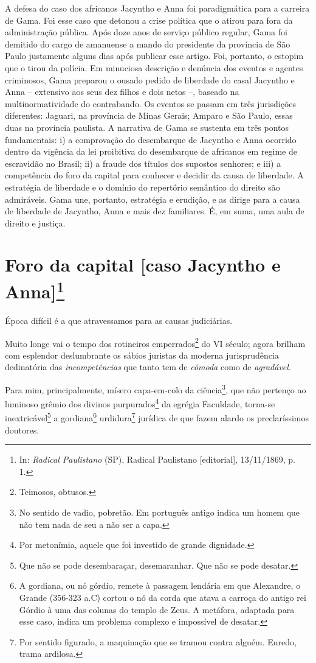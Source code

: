 {\small\noindent
A defesa do caso dos africanos Jacyntho e Anna foi paradigmática
para a carreira de Gama. Foi esse caso que detonou a crise política que
o atirou para fora da administração pública. Após doze anos de serviço
público regular, Gama foi demitido do cargo de amanuense a mando do
presidente da província de São Paulo justamente alguns dias após
publicar esse artigo. Foi, portanto, o estopim que o tirou da polícia.
Em minuciosa descrição e denúncia dos eventos e agentes criminosos, Gama
preparou o ousado pedido de liberdade do casal Jacyntho e Anna --
extensivo aos seus dez filhos e dois netos --, baseado na
multinormatividade do contrabando. Os eventos se passam em três
jurisdições diferentes: Jaguari, na província de Minas Gerais; Amparo e
São Paulo, essas duas na província paulista. A narrativa de Gama se
sustenta em três pontos fundamentais: i) a comprovação do desembarque de
Jacyntho e Anna ocorrido dentro da vigência da lei proibitiva do
desembarque de africanos em regime de escravidão no Brasil; ii) a fraude
dos títulos dos supostos senhores; e iii) a competência do foro da
capital para conhecer e decidir da causa de liberdade. A estratégia de
liberdade e o domínio do repertório semântico do direito são admiráveis.
Gama une, portanto, estratégia e erudição, e as dirige para a causa de
liberdade de Jacyntho, Anna e mais dez familiares. É, em suma, uma aula
de direito e justiça.}

\chapter{Foro da capital {[}caso Jacyntho e Anna{]}\footnote[*]{In:
  \emph{Radical Paulistano} (SP), Radical Paulistano {[}editorial{]},
  13/11/1869, p. 1.}}

Época difícil é a que atravessamos para as causas judiciárias.

Muito longe vai o tempo dos rotineiros emperrados\footnote{Teimosos,
  obtusos.} do VI século; agora brilham com esplendor deslumbrante os
sábios juristas da moderna jurisprudência dedinatória das
\emph{incompetências} que tanto tem de \emph{cômoda} como de
\emph{agradável}.

Para mim, principalmente, mísero capa-em-colo da ciência\footnote{No
  sentido de vadio, pobretão. Em português antigo indica um homem que
  não tem nada de seu a não ser a capa.}, que não pertenço ao luminoso
grêmio dos divinos purpurados\footnote{Por metonímia, aquele que foi
  investido de grande dignidade.} da egrégia Faculdade, torna-se
inextricável\footnote{Que não se pode desembaraçar, desemaranhar. Que
  não se pode desatar.} a gordiana\footnote{A gordiana, ou nó górdio,
  remete à passagem lendária em que Alexandre, o Grande (356-323 a.C)
  cortou o nó da corda que atava a carroça do antigo rei Górdio à uma
  das colunas do templo de Zeus. A metáfora, adaptada para esse caso,
  indica um problema complexo e impossível de desatar.}
urdidura\footnote{Por sentido figurado, a maquinação que se tramou
  contra alguém. Enredo, trama ardilosa.} jurídica de que fazem alardo
os preclaríssimos doutores.

